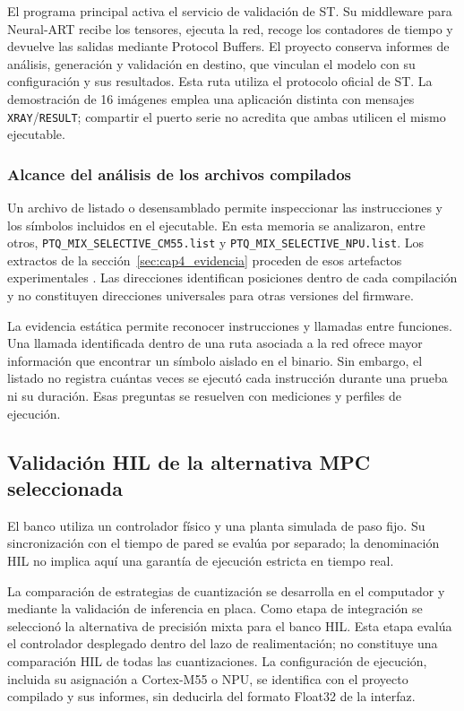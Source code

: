 El programa principal activa el servicio de validación de ST. Su middleware para Neural-ART recibe los tensores, ejecuta la red, recoge los contadores de tiempo y devuelve las salidas mediante Protocol Buffers. El proyecto conserva informes de análisis, generación y validación en destino, que vinculan el modelo con su configuración y sus resultados. Esta ruta utiliza el protocolo oficial de ST. La demostración de 16 imágenes emplea una aplicación distinta con mensajes \texttt{XRAY}/\texttt{RESULT}; compartir el puerto serie no acredita que ambas utilicen el mismo ejecutable.

\subsubsection{Alcance del análisis de los archivos compilados}\label{sec:analisis_listados}
Un archivo de listado o desensamblado permite inspeccionar las instrucciones y los símbolos incluidos en el ejecutable. En esta memoria se analizaron, entre otros, \texttt{PTQ\_\allowbreak MIX\_\allowbreak SELECTIVE\_\allowbreak CM55.list} y \texttt{PTQ\_\allowbreak MIX\_\allowbreak SELECTIVE\_\allowbreak NPU.list}. Los extractos de la sección~\ref{sec:cap4_evidencia} proceden de esos artefactos experimentales \cite{cap4_evidence}. Las direcciones identifican posiciones dentro de cada compilación y no constituyen direcciones universales para otras versiones del firmware.

La evidencia estática permite reconocer instrucciones y llamadas entre funciones. Una llamada identificada dentro de una ruta asociada a la red ofrece mayor información que encontrar un símbolo aislado en el binario. Sin embargo, el listado no registra cuántas veces se ejecutó cada instrucción durante una prueba ni su duración. Esas preguntas se resuelven con mediciones y perfiles de ejecución.


\subsection{Validación HIL de la alternativa MPC seleccionada}\label{sec:hil_seleccionada}
El banco utiliza un controlador físico y una planta simulada de paso fijo. Su sincronización con el tiempo de pared se evalúa por separado; la denominación HIL no implica aquí una garantía de ejecución estricta en tiempo real.


La comparación de estrategias de cuantización se desarrolla en el computador y mediante la validación de inferencia en placa. Como etapa de integración se seleccionó la alternativa de precisión mixta para el banco HIL. Esta etapa evalúa el controlador desplegado dentro del lazo de realimentación; no constituye una comparación HIL de todas las cuantizaciones. La configuración de ejecución, incluida su asignación a Cortex-M55 o NPU, se identifica con el proyecto compilado y sus informes, sin deducirla del formato Float32 de la interfaz.

